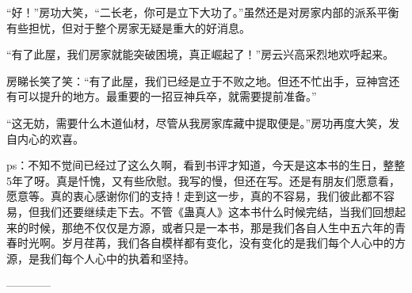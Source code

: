 \begin{this_body}
“好！”房功大笑，“二长老，你可是立下大功了。”虽然还是对房家内部的派系平衡有些担忧，但对于整个房家无疑是重大的好消息。

“有了此屋，我们房家就能突破困境，真正崛起了！”房云兴高采烈地欢呼起来。

房睇长笑了笑：“有了此屋，我们已经是立于不败之地。但还不忙出手，豆神宫还有可以提升的地方。最重要的一招豆神兵卒，就需要提前准备。”

“这无妨，需要什么木道仙材，尽管从我房家库藏中提取便是。”房功再度大笑，发自内心的欢喜。

ps：不知不觉间已经过了这么久啊，看到书评才知道，今天是这本书的生日，整整5年了呀。真是忏愧，又有些欣慰。我写的慢，但还在写。还是有朋友们愿意看，愿意等。真的衷心感谢你们的支持！走到这一步，真的不容易，我们彼此都不容易，但我们还要继续走下去。不管《蛊真人》这本书什么时候完结，当我们回想起来的时候，那绝不仅仅是方源，或者只是一本书，那是我们各自人生中五六年的青春时光啊。岁月荏苒，我们各自模样都有变化，没有变化的是我们每个人心中的方源，是我们每个人心中的执着和坚持。

------------

\end{this_body}

